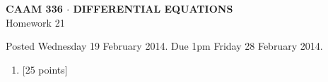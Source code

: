 \documentclass[10pt]{article}
\begin{document}
\vspace*{-5em}
\begin{center}
\large \textsf{\textbf{CAAM 336 $\cdot$ DIFFERENTIAL EQUATIONS}\\[0.5em]
Homework 21 }
\end{center}

Posted Wednesday 19 February 2014.  Due 1pm Friday 28 February 2014.

\begin{enumerate}\addtocounter{enumi}{20}
\item {[25 points]}  
\end{enumerate}
\end{document}
